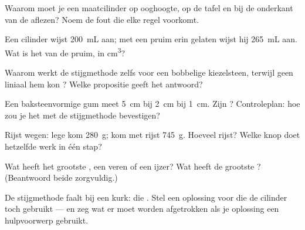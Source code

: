 \begin{exercise}[$\star$]\label{exo:g6:mass-and-volume:3}
Waarom moet je een maatcilinder op ooghoogte, op de tafel en bij de
onderkant van de  aflezen? Noem de fout die elke regel
voorkomt.
\end{exercise}

\begin{exercise}[$\star$]\label{exo:g6:mass-and-volume:4}
Een cilinder wijst \qty{200}{mL} aan; met een pruim erin gelaten wijst
hij \qty{265}{mL} aan. Wat is het  van de pruim, in
\unit{cm^3}?
\end{exercise}

\begin{exercise}[$\star$]\label{exo:g6:mass-and-volume:5}
Waarom werkt de stijgmethode zelfs voor een bobbelige kiezelsteen,
terwijl geen liniaal hem kon ? Welke propositie geeft het
antwoord?
\end{exercise}

\begin{exercise}[$\star$]\label{exo:g6:mass-and-volume:6}
Een baksteenvormige gum meet \qty{5}{cm} bij \qty{2}{cm} bij
\qty{1}{cm}. Zijn ? Controleplan: hoe zou je het met de
stijgmethode bevestigen?
\end{exercise}

\begin{exercise}[$\star$]\label{exo:g6:mass-and-volume:7}
Rijst wegen: lege kom \qty{280}{g}; kom met rijst \qty{745}{g}.
Hoeveel rijst? Welke knop doet hetzelfde werk in één stap?
\end{exercise}

\begin{exercise}[$\star$]\label{exo:g6:mass-and-volume:8}
Wat heeft het grootste , een  veren of een
 ijzer? Wat heeft de grootste ? (Beantwoord beide
zorgvuldig.)
\end{exercise}

\begin{exercise}[$\star\star$]\label{exo:g6:mass-and-volume:9}
De stijgmethode faalt bij een kurk: die . Stel een oplossing
voor die de cilinder toch gebruikt --- en zeg wat er moet worden
afgetrokken als je oplossing een hulpvoorwerp gebruikt.
\end{exercise}

